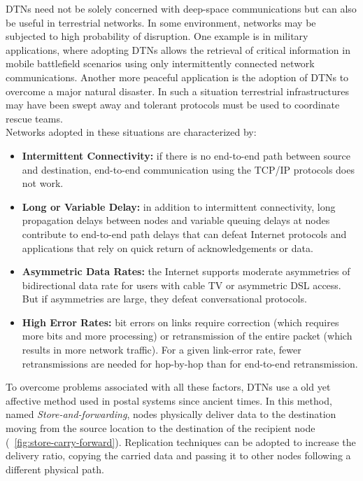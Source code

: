 DTNs need not be solely concerned with deep-space communications but can also be useful in terrestrial networks. In some environment, networks may be subjected to high probability of disruption. One example is in military applications, where adopting DTNs allows the retrieval of critical information in mobile battlefield scenarios using only intermittently connected network communications. Another more peaceful application is the adoption of DTNs to overcome a major natural disaster. In such a situation terrestrial infrastructures may have been swept away and tolerant protocols must be used to coordinate rescue teams.  
\\
Networks adopted in these situations are characterized by:
\begin{itemize}
\item \textbf{Intermittent Connectivity:} if there is no end-to-end path between source and destination, end-to-end communication using the TCP/IP protocols does not work.
\item \textbf{Long or Variable Delay:} in addition to intermittent connectivity, long propagation delays between nodes and variable queuing delays at nodes contribute to end-to-end path delays that can defeat Internet protocols and applications that rely on quick return of acknowledgements or data.
\item \textbf{Asymmetric Data Rates:} the Internet supports moderate asymmetries of bidirectional data rate for users with cable TV or asymmetric DSL access. But if asymmetries are large, they defeat conversational protocols.
\item \textbf{High Error Rates:} bit errors on links require correction (which requires more bits and more processing) or retransmission of the entire packet (which results in more network traffic). For a given link-error rate, fewer retransmissions are needed for hop-by-hop than for end-to-end retransmission.
\end{itemize}

To overcome problems associated with all these factors, DTNs use a old yet affective method used in postal systems since ancient times. In this method, named \textit{Store-and-forwarding}, nodes physically deliver data to the destination moving from the source location to the destination of the recipient node (\figurename~\ref{fig:store-carry-forward}). Replication techniques can be adopted to increase the delivery ratio, copying the carried data and passing it to other nodes following a different physical path.

